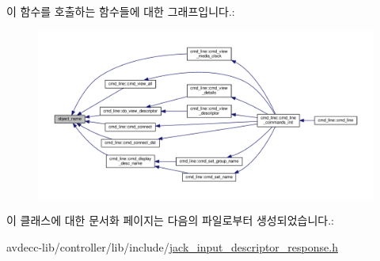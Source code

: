 이 함수를 호출하는 함수들에 대한 그래프입니다.\+:
\nopagebreak
\begin{figure}[H]
\begin{center}
\leavevmode
\includegraphics[width=350pt]{classavdecc__lib_1_1descriptor__response__base_a133f7774946d80f82b8aaaa4cfbb7361_icgraph}
\end{center}
\end{figure}




이 클래스에 대한 문서화 페이지는 다음의 파일로부터 생성되었습니다.\+:\begin{DoxyCompactItemize}
\item 
avdecc-\/lib/controller/lib/include/\hyperlink{jack__input__descriptor__response_8h}{jack\+\_\+input\+\_\+descriptor\+\_\+response.\+h}\end{DoxyCompactItemize}
